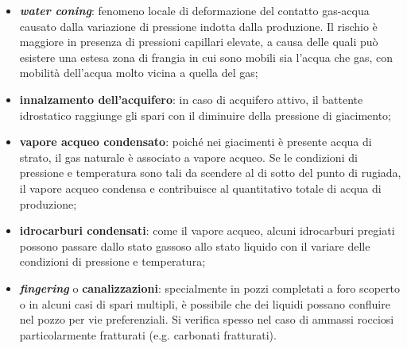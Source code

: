 \begin{itemize}
    \item \textbf{\textit{water coning}}: fenomeno locale di deformazione del contatto gas-acqua causato dalla variazione di pressione indotta dalla produzione. Il rischio è maggiore in presenza di pressioni capillari elevate, a causa delle quali può esistere una estesa zona di frangia in cui sono mobili sia l’acqua che gas, con mobilità dell'acqua molto vicina a quella del gas;
    \item \textbf{innalzamento dell'acquifero}: in caso di acquifero attivo, il battente idrostatico raggiunge gli spari con il diminuire della pressione di giacimento;
    \item \textbf{vapore acqueo condensato}: poiché nei giacimenti è  presente acqua di strato, il gas naturale è associato a vapore acqueo. Se le condizioni di pressione e temperatura sono tali da scendere al di sotto del punto di rugiada, il vapore acqueo condensa e contribuisce al quantitativo totale di acqua di produzione;
    \item \textbf{idrocarburi condensati}: come il vapore acqueo, alcuni idrocarburi pregiati possono passare dallo stato gassoso allo stato liquido con il variare delle condizioni di pressione e temperatura;
    \item \textbf{\textit{fingering}} o \textbf{canalizzazioni}: specialmente in pozzi completati a foro scoperto o in alcuni casi di spari multipli, è possibile che dei liquidi possano confluire nel pozzo per vie preferenziali. Si verifica spesso nel caso di ammassi rocciosi particolarmente fratturati (e.g. carbonati fratturati).
\end{itemize}


